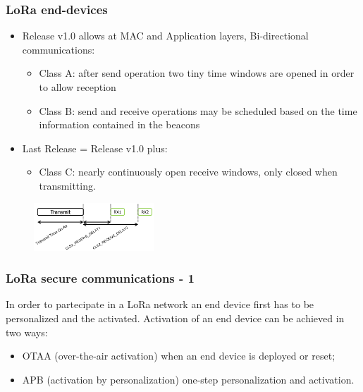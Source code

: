 \begin{frame}[fragile]
  \frametitle{LoRa end-devices}
  \begin{itemize}
   \item  Release v1.0 allows at MAC and Application layers, Bi-directional communications:
     \begin{itemize}
       \item Class A: after send operation two tiny time windows are opened in order to allow reception
       \item Class B: send and receive operations may be scheduled based on the time information contained in the beacons
     \end{itemize}
    \item  Last Release = Release v1.0 plus:
     \begin{itemize}
       \item Class C: nearly continuously open receive windows, only closed when transmitting.
     \end{itemize}
  \end{itemize}
  \begin{figure}
  \centering
  \includegraphics[width=0.4\textwidth]{img/lora_rx_windows.png}
  \end{figure}

\end{frame}


\begin{frame}[fragile]
  \frametitle{LoRa secure communications - 1}
  In order to partecipate in a LoRa network an end device first has to be personalized and the activated.
  Activation of an end device can be achieved in two ways:
  \begin{itemize}
    \item OTAA (over-the-air activation) when an end device is deployed or reset;
    \item APB (activation by personalization) one-step personalization and activation.
  \end{itemize}
\end{frame}

